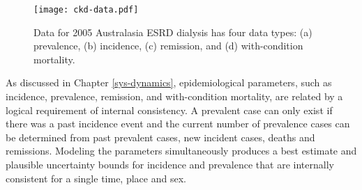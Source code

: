 
    \begin{figure}[h]
        \begin{center}
            \texttt{[image: ckd-data.pdf]}
            \caption{Data for 2005 Australasia ESRD dialysis has four
              data types: (a) prevalence, (b) incidence, (c)
              remission, and (d) with-condition mortality.}
            \label{fig:app-CKD data}
        \end{center}
    \end{figure}

As discussed in Chapter \ref{sys-dynamics}, epidemiological parameters,
such as incidence, prevalence, remission, and with-condition
mortality, are related by a logical requirement of internal
consistency.  A prevalent case can only exist if there was a past
incidence event and the current number of prevalence cases can be
determined from past prevalent cases, new incident cases, deaths and
remissions.  Modeling the parameters simultaneously produces a best
estimate and plausible uncertainty bounds for incidence and prevalence
that are internally consistent for a single time, place and sex.


